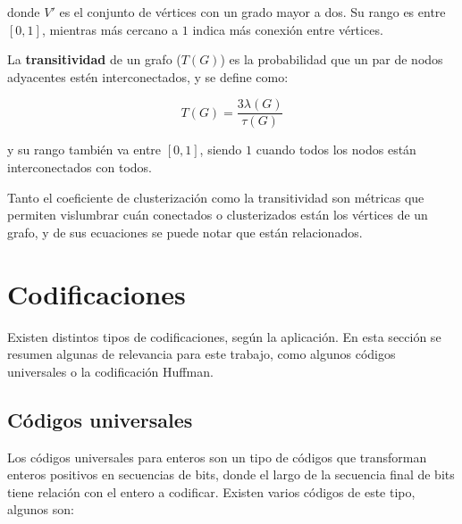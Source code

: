\noindent donde $V'$ es el conjunto de vértices con un grado mayor a dos. Su rango es entre $[0, 1]$, mientras más cercano a $1$ indica más conexión entre vértices.

La \textbf{transitividad} de un grafo ($T(G)$) es la probabilidad que un par de nodos adyacentes estén interconectados, y se define como:

\begin{equation}
	T(G) = \dfrac{3 \lambda(G)}{\tau(G)} \label{eq:T} 
\end{equation}

\noindent y su rango también va entre $[0, 1]$, siendo $1$ cuando todos los nodos están interconectados con todos.

Tanto el coeficiente de clusterización como la transitividad son métricas que permiten vislumbrar cuán conectados o clusterizados están los vértices de un grafo, y de sus ecuaciones se puede notar que están relacionados.

\section{Codificaciones}

Existen distintos tipos de codificaciones, según la aplicación. En esta sección se resumen algunas de relevancia para este trabajo, como algunos códigos universales o la codificación Huffman.

\subsection{Códigos universales}\label{sec:Ucoding}
Los códigos universales para enteros son un tipo de códigos que transforman enteros positivos en secuencias de bits, donde el largo de la secuencia final de bits tiene relación con el entero a codificar. Existen varios códigos de este tipo, algunos son:

